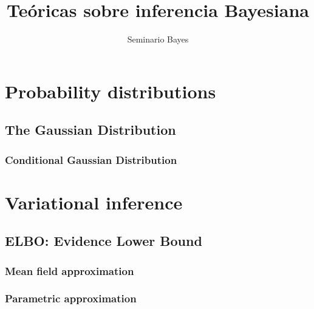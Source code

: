 \documentclass[a4paper,10pt]{book}
\title{Te\'oricas sobre inferencia Bayesiana}
\author{Seminario Bayes}
\begin{document}
\maketitle

\chapter{Probability distributions}

\section{The Gaussian Distribution}



\subsection{Conditional Gaussian Distribution}



\chapter{Variational inference}

\section{ELBO: Evidence Lower Bound}



\subsection{Mean field approximation}



\subsection{Parametric approximation}


\end{document}

